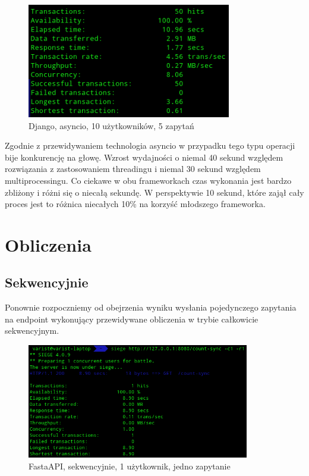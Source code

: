 \begin{figure}[H]
    \includegraphics[height=50mm]{zdjecia/10_req_asyncio_django}
    \centering
    \caption{Django, asyncio, 10 użytkowników, 5 zapytań}
\end{figure}
Zgodnie z przewidywaniem technologia asyncio w przypadku tego typu operacji bije konkurencję na głowę. Wzrost wydajności o niemal 40 sekund względem rozwiązania z zastosowaniem threadingu i niemal 30 sekund względem multiprocessingu. Co ciekawe w obu frameworkach czas wykonania jest bardzo zbliżony i różni się o niecałą sekundę. W perspektywie 10 sekund, które zajął cały proces jest to różnica niecałych 10\% na korzyść młodszego frameworka.

\section{Obliczenia}
\subsection{Sekwencyjnie}
Ponownie rozpoczniemy od obejrzenia wyniku wysłania pojedynczego zapytania na endpoint wykonujący przewidywane obliczenia w trybie całkowicie sekwencyjnym.
\begin{figure}[H]
    \includegraphics[height=50mm]{zdjecia/1_math_sync_fast}
    \centering
    \caption{FastaAPI, sekwencyjnie, 1 użytkownik, jedno zapytanie}
\end{figure}

